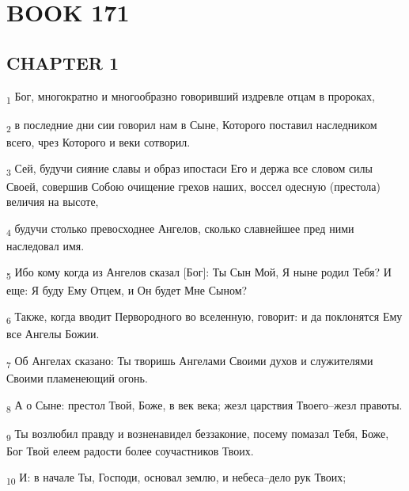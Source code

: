 \section{BOOK 171}
\subsection{CHAPTER 1}
\begin{tcolorbox}
\textsubscript{1} Бог, многократно и многообразно говоривший издревле отцам в пророках,
\end{tcolorbox}
\begin{tcolorbox}
\textsubscript{2} в последние дни сии говорил нам в Сыне, Которого поставил наследником всего, чрез Которого и веки сотворил.
\end{tcolorbox}
\begin{tcolorbox}
\textsubscript{3} Сей, будучи сияние славы и образ ипостаси Его и держа все словом силы Своей, совершив Собою очищение грехов наших, воссел одесную (престола) величия на высоте,
\end{tcolorbox}
\begin{tcolorbox}
\textsubscript{4} будучи столько превосходнее Ангелов, сколько славнейшее пред ними наследовал имя.
\end{tcolorbox}
\begin{tcolorbox}
\textsubscript{5} Ибо кому когда из Ангелов сказал [Бог]: Ты Сын Мой, Я ныне родил Тебя? И еще: Я буду Ему Отцем, и Он будет Мне Сыном?
\end{tcolorbox}
\begin{tcolorbox}
\textsubscript{6} Также, когда вводит Первородного во вселенную, говорит: и да поклонятся Ему все Ангелы Божии.
\end{tcolorbox}
\begin{tcolorbox}
\textsubscript{7} Об Ангелах сказано: Ты творишь Ангелами Своими духов и служителями Своими пламенеющий огонь.
\end{tcolorbox}
\begin{tcolorbox}
\textsubscript{8} А о Сыне: престол Твой, Боже, в век века; жезл царствия Твоего--жезл правоты.
\end{tcolorbox}
\begin{tcolorbox}
\textsubscript{9} Ты возлюбил правду и возненавидел беззаконие, посему помазал Тебя, Боже, Бог Твой елеем радости более соучастников Твоих.
\end{tcolorbox}
\begin{tcolorbox}
\textsubscript{10} И: в начале Ты, Господи, основал землю, и небеса--дело рук Твоих;
\end{tcolorbox}

